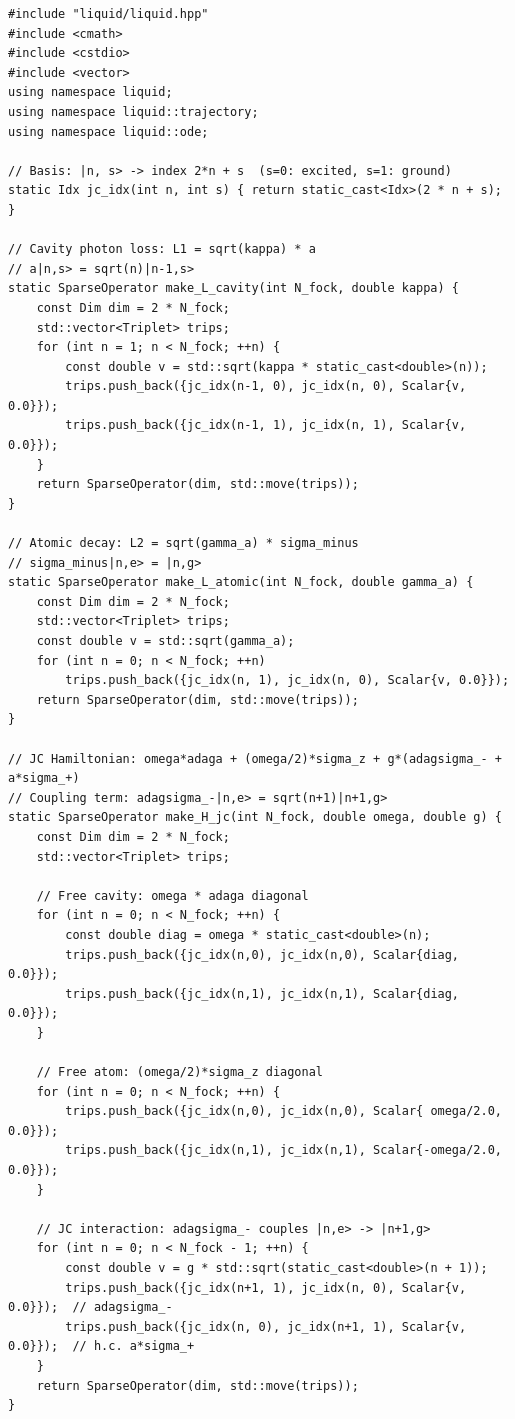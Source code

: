 \documentclass[11pt,a4paper,twoside]{book}
\theoremstyle{definition}
\theoremstyle{remark}
\begin{document}
\begin{verbatim}
#include "liquid/liquid.hpp"
#include <cmath>
#include <cstdio>
#include <vector>
using namespace liquid;
using namespace liquid::trajectory;
using namespace liquid::ode;

// Basis: |n, s> -> index 2*n + s  (s=0: excited, s=1: ground)
static Idx jc_idx(int n, int s) { return static_cast<Idx>(2 * n + s); }

// Cavity photon loss: L1 = sqrt(kappa) * a
// a|n,s> = sqrt(n)|n-1,s>
static SparseOperator make_L_cavity(int N_fock, double kappa) {
    const Dim dim = 2 * N_fock;
    std::vector<Triplet> trips;
    for (int n = 1; n < N_fock; ++n) {
        const double v = std::sqrt(kappa * static_cast<double>(n));
        trips.push_back({jc_idx(n-1, 0), jc_idx(n, 0), Scalar{v, 0.0}});
        trips.push_back({jc_idx(n-1, 1), jc_idx(n, 1), Scalar{v, 0.0}});
    }
    return SparseOperator(dim, std::move(trips));
}

// Atomic decay: L2 = sqrt(gamma_a) * sigma_minus
// sigma_minus|n,e> = |n,g>
static SparseOperator make_L_atomic(int N_fock, double gamma_a) {
    const Dim dim = 2 * N_fock;
    std::vector<Triplet> trips;
    const double v = std::sqrt(gamma_a);
    for (int n = 0; n < N_fock; ++n)
        trips.push_back({jc_idx(n, 1), jc_idx(n, 0), Scalar{v, 0.0}});
    return SparseOperator(dim, std::move(trips));
}

// JC Hamiltonian: omega*adaga + (omega/2)*sigma_z + g*(adagsigma_- + a*sigma_+)
// Coupling term: adagsigma_-|n,e> = sqrt(n+1)|n+1,g>
static SparseOperator make_H_jc(int N_fock, double omega, double g) {
    const Dim dim = 2 * N_fock;
    std::vector<Triplet> trips;

    // Free cavity: omega * adaga diagonal
    for (int n = 0; n < N_fock; ++n) {
        const double diag = omega * static_cast<double>(n);
        trips.push_back({jc_idx(n,0), jc_idx(n,0), Scalar{diag, 0.0}});
        trips.push_back({jc_idx(n,1), jc_idx(n,1), Scalar{diag, 0.0}});
    }

    // Free atom: (omega/2)*sigma_z diagonal
    for (int n = 0; n < N_fock; ++n) {
        trips.push_back({jc_idx(n,0), jc_idx(n,0), Scalar{ omega/2.0, 0.0}});
        trips.push_back({jc_idx(n,1), jc_idx(n,1), Scalar{-omega/2.0, 0.0}});
    }

    // JC interaction: adagsigma_- couples |n,e> -> |n+1,g>
    for (int n = 0; n < N_fock - 1; ++n) {
        const double v = g * std::sqrt(static_cast<double>(n + 1));
        trips.push_back({jc_idx(n+1, 1), jc_idx(n, 0), Scalar{v, 0.0}});  // adagsigma_-
        trips.push_back({jc_idx(n, 0), jc_idx(n+1, 1), Scalar{v, 0.0}});  // h.c. a*sigma_+
    }
    return SparseOperator(dim, std::move(trips));
}


\end{verbatim}
\end{document}
